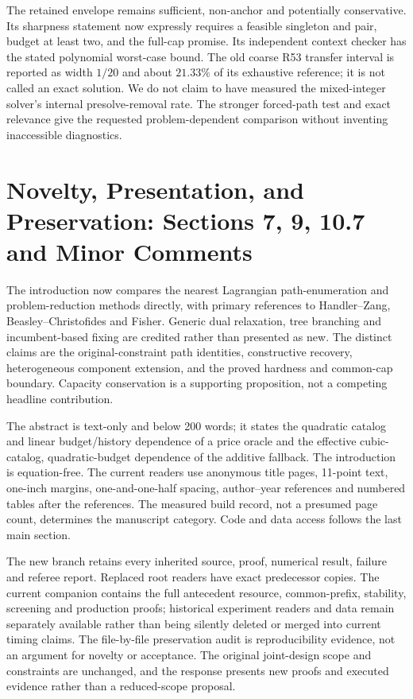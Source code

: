 The retained envelope remains sufficient, non-anchor and potentially conservative. Its sharpness statement now expressly requires a feasible singleton and pair, budget at least two, and the full-cap promise. Its independent context checker has the stated polynomial worst-case bound. The old coarse R53 transfer interval is reported as width $1/20$ and about $21.33\%$ of its exhaustive reference; it is not called an exact solution. We do not claim to have measured the mixed-integer solver's internal presolve-removal rate. The stronger forced-path test and exact relevance give the requested problem-dependent comparison without inventing inaccessible diagnostics.

\section{Novelty, Presentation, and Preservation: Sections 7, 9, 10.7 and Minor Comments}
The introduction now compares the nearest Lagrangian path-enumeration and problem-reduction methods directly, with primary references to Handler--Zang, Beasley--Christofides and Fisher. Generic dual relaxation, tree branching and incumbent-based fixing are credited rather than presented as new. The distinct claims are the original-constraint path identities, constructive recovery, heterogeneous component extension, and the proved hardness and common-cap boundary. Capacity conservation is a supporting proposition, not a competing headline contribution.

The abstract is text-only and below 200 words; it states the quadratic catalog and linear budget/history dependence of a price oracle and the effective cubic-catalog, quadratic-budget dependence of the additive fallback. The introduction is equation-free. The current readers use anonymous title pages, 11-point text, one-inch margins, one-and-one-half spacing, author--year references and numbered tables after the references. The measured build record, not a presumed page count, determines the manuscript category. Code and data access follows the last main section.

The new branch retains every inherited source, proof, numerical result, failure and referee report. Replaced root readers have exact predecessor copies. The current companion contains the full antecedent resource, common-prefix, stability, screening and production proofs; historical experiment readers and data remain separately available rather than being silently deleted or merged into current timing claims. The file-by-file preservation audit is reproducibility evidence, not an argument for novelty or acceptance. The original joint-design scope and constraints are unchanged, and the response presents new proofs and executed evidence rather than a reduced-scope proposal.

